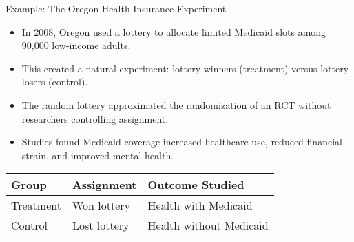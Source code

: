 \documentclass{beamer}
\begin{document}
	\begin{frame}{Example: The Oregon Health Insurance Experiment}
		\begin{itemize}
			\item In 2008, Oregon used a lottery to allocate limited Medicaid slots among 90,000 low-income adults.
			\item This created a natural experiment: lottery winners (treatment) versus lottery losers (control).
			\item The random lottery approximated the randomization of an RCT without researchers controlling assignment.
			\item Studies found Medicaid coverage increased healthcare use, reduced financial strain, and improved mental health.
		\end{itemize}
		
		\begin{example}
			\begin{tabular}{l|l|l}
				\textbf{Group} & \textbf{Assignment} & \textbf{Outcome Studied} \\
				\hline
				Treatment & Won lottery & Health with Medicaid \\
				Control & Lost lottery & Health without Medicaid \\
				\hline
			\end{tabular}
		\end{example}
	\end{frame}
	
\end{document}
